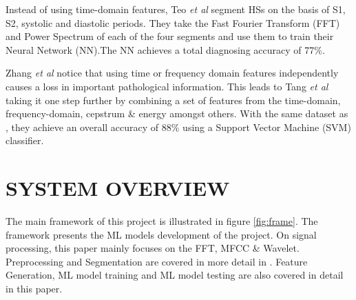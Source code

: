 \documentclass[10pt,twocolumn]{witseiepaper}
\begin{document}
Instead of using time-domain features, Teo \textit{et al} \cite{17} segment HSs on the basis of S1, S2, systolic and diastolic periods. They take the Fast Fourier Transform (FFT) and Power Spectrum of each of the four segments and use them to train their Neural Network (NN).The NN achieves a total diagnosing accuracy of  77\%. 

Zhang \textit{et al} \cite{16} notice that using time or frequency domain features independently causes a loss in important pathological information. This leads to Tang \textit{et al} \cite{22} taking it one step further by combining a set of features from the time-domain, frequency-domain, cepstrum \& energy amongst others. With the same dataset as \cite{17}, they achieve an overall accuracy of 88\% using a Support Vector Machine (SVM) classifier.

\section{SYSTEM OVERVIEW}
The main framework of this project is illustrated in figure \ref{fig:frame}. The framework presents the ML models development of the project. On signal processing, this paper mainly focuses on the FFT, MFCC \& Wavelet. Preprocessing and Segmentation are covered in more detail in \cite{love}. Feature Generation, ML model training and ML model testing are also covered in detail in this paper.
\end{document}
